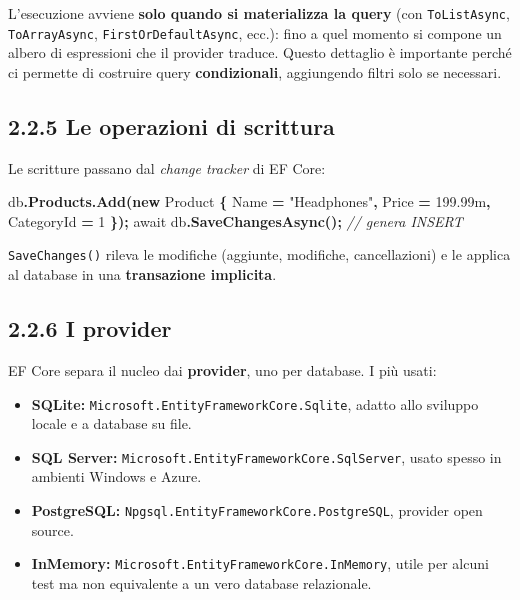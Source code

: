 \documentclass[
  italian,
  10pt,
]{book}
\newenvironment{Shaded}{\begin{snugshade}}{\end{snugshade}}
\newcommand{\CommentTok}[1]{\textcolor[rgb]{0.56,0.35,0.01}{\textit{#1}}}
\newcommand{\DecValTok}[1]{\textcolor[rgb]{0.00,0.00,0.81}{#1}}
\newcommand{\FloatTok}[1]{\textcolor[rgb]{0.00,0.00,0.81}{#1}}
\newcommand{\FunctionTok}[1]{\textcolor[rgb]{0.13,0.29,0.53}{\textbf{#1}}}
\newcommand{\KeywordTok}[1]{\textcolor[rgb]{0.13,0.29,0.53}{\textbf{#1}}}
\newcommand{\NormalTok}[1]{#1}
\newcommand{\OperatorTok}[1]{\textcolor[rgb]{0.81,0.36,0.00}{\textbf{#1}}}
\newcommand{\StringTok}[1]{\textcolor[rgb]{0.31,0.60,0.02}{#1}}
\providecommand{\tightlist}{%
  \setlength{\itemsep}{0pt}\setlength{\parskip}{0pt}}
\begin{document}
L'esecuzione avviene \textbf{solo quando si materializza la query} (con
\texttt{ToListAsync}, \texttt{ToArrayAsync},
\texttt{FirstOrDefaultAsync}, ecc.): fino a quel momento si compone un
albero di espressioni che il provider traduce. Questo dettaglio è
importante perché ci permette di costruire query \textbf{condizionali},
aggiungendo filtri solo se necessari.

\subsection{2.2.5 Le operazioni di
scrittura}\label{le-operazioni-di-scrittura}

Le scritture passano dal \emph{change tracker} di EF Core:

\begin{Shaded}
\begin{Highlighting}[]
\NormalTok{db}\OperatorTok{.}\FunctionTok{Products}\OperatorTok{.}\FunctionTok{Add}\OperatorTok{(}\KeywordTok{new}\NormalTok{ Product }\OperatorTok{\{}\NormalTok{ Name }\OperatorTok{=} \StringTok{"Headphones"}\OperatorTok{,}\NormalTok{ Price }\OperatorTok{=} \FloatTok{199.99m}\OperatorTok{,}\NormalTok{ CategoryId }\OperatorTok{=} \DecValTok{1} \OperatorTok{\});}
\NormalTok{await db}\OperatorTok{.}\FunctionTok{SaveChangesAsync}\OperatorTok{();} \CommentTok{// genera INSERT}
\end{Highlighting}
\end{Shaded}

\texttt{SaveChanges()} rileva le modifiche (aggiunte, modifiche,
cancellazioni) e le applica al database in una \textbf{transazione
implicita}.

\subsection{2.2.6 I provider}\label{i-provider}

EF Core separa il nucleo dai \textbf{provider}, uno per database. I più
usati:

\begin{itemize}
\tightlist
\item
  \textbf{SQLite:} \texttt{Microsoft.EntityFrameworkCore.Sqlite}, adatto
  allo sviluppo locale e a database su file.
\item
  \textbf{SQL Server:} \texttt{Microsoft.EntityFrameworkCore.SqlServer},
  usato spesso in ambienti Windows e Azure.
\item
  \textbf{PostgreSQL:} \texttt{Npgsql.EntityFrameworkCore.PostgreSQL},
  provider open source.
\item
  \textbf{InMemory:} \texttt{Microsoft.EntityFrameworkCore.InMemory},
  utile per alcuni test ma non equivalente a un vero database
  relazionale.
\end{itemize}
\end{document}
